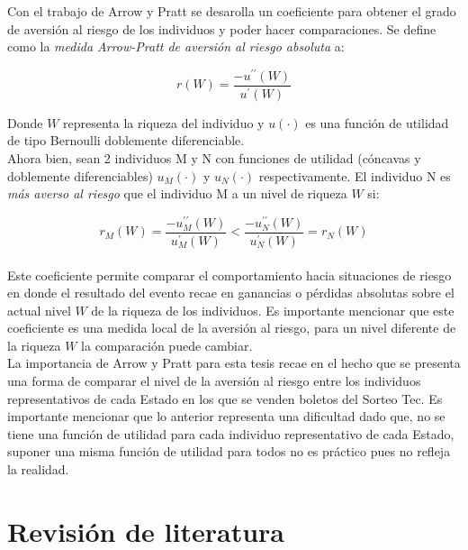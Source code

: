 Con el trabajo de Arrow y Pratt se desarolla un coeficiente para obtener el grado de aversión al riesgo de los individuos y poder hacer comparaciones. Se define como la \textit{medida Arrow-Pratt de aversión al riesgo absoluta} a:

\begin{equation}
    r(W) = \frac{-u^{\prime \prime}(W)}{u^{\prime}(W)}
\end{equation}

Donde $W$ representa la riqueza del individuo y $u(\cdot)$ es una función de utilidad de tipo Bernoulli doblemente diferenciable. \\

Ahora bien, sean 2 individuos M y N con funciones de utilidad (cóncavas y doblemente diferenciables) $u_M(\cdot)$ y $u_N(\cdot)$ respectivamente. El individuo N es \textit{más averso al riesgo} que el individuo M a un nivel de riqueza $W$ si:

\begin{equation}
    r_M(W) = \frac{-u_M^{\prime \prime}(W)}{u_M^{\prime}(W)} < \frac{-u_N^{\prime \prime}(W)}{u_N^{\prime}(W)} = r_N(W)
\end{equation} \\

Este coeficiente permite comparar el comportamiento hacia situaciones de riesgo en donde el resultado del evento recae en ganancias o pérdidas absolutas sobre el actual nivel $W$ de la riqueza de los individuos. Es importante mencionar que este coeficiente es una medida local de la aversión al riesgo, para un nivel diferente de la riqueza $W$ la comparación puede cambiar. \\


La importancia de Arrow y Pratt para esta tesis recae en el hecho que se presenta una forma de comparar el nivel de la aversión al riesgo entre los individuos representativos de cada Estado en los que se venden boletos del Sorteo Tec. Es importante mencionar que lo anterior representa una dificultad dado que, no se tiene una función de utilidad para cada individuo representativo de cada Estado, suponer una misma función de utilidad para todos no es práctico pues no refleja la realidad.


\section{Revisión de literatura}


